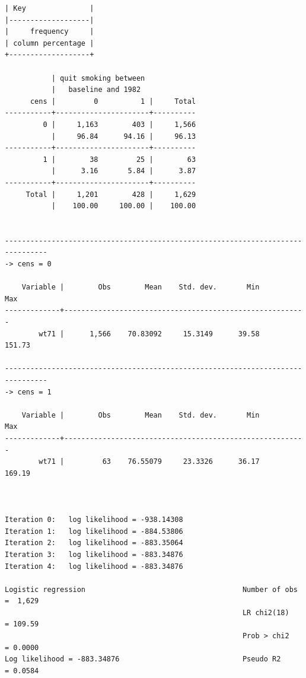 \documentclass[
  10pt,
]{book}
\begin{document}
\begin{verbatim}
| Key               |
|-------------------|
|     frequency     |
| column percentage |
+-------------------+

           | quit smoking between
           |   baseline and 1982
      cens |         0          1 |     Total
-----------+----------------------+----------
         0 |     1,163        403 |     1,566 
           |     96.84      94.16 |     96.13 
-----------+----------------------+----------
         1 |        38         25 |        63 
           |      3.16       5.84 |      3.87 
-----------+----------------------+----------
     Total |     1,201        428 |     1,629 
           |    100.00     100.00 |    100.00 


--------------------------------------------------------------------------------
-> cens = 0

    Variable |        Obs        Mean    Std. dev.       Min        Max
-------------+---------------------------------------------------------
        wt71 |      1,566    70.83092     15.3149      39.58     151.73

--------------------------------------------------------------------------------
-> cens = 1

    Variable |        Obs        Mean    Std. dev.       Min        Max
-------------+---------------------------------------------------------
        wt71 |         63    76.55079     23.3326      36.17     169.19



Iteration 0:   log likelihood = -938.14308  
Iteration 1:   log likelihood = -884.53806  
Iteration 2:   log likelihood = -883.35064  
Iteration 3:   log likelihood = -883.34876  
Iteration 4:   log likelihood = -883.34876  

Logistic regression                                     Number of obs =  1,629
                                                        LR chi2(18)   = 109.59
                                                        Prob > chi2   = 0.0000
Log likelihood = -883.34876                             Pseudo R2     = 0.0584


\end{verbatim}
\end{document}
